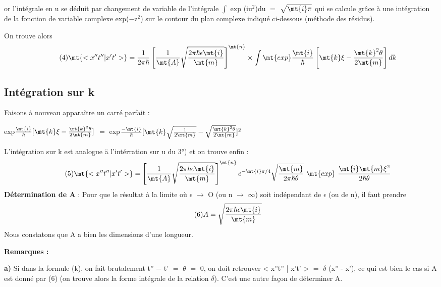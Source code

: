 or l'intégrale en u se déduit par changement de variable de
l'intégrale $\int$ exp (iu$^2$)du $=$ $\sqrt{\mt{i}\pi}$ qui se calcule grâce à une intégration
de la fonction de variable complexe exp($-$z$^2$) sur le contour du plan complexe
indiqué ci-dessous (méthode des résidus).
\begin{center}
\end{center}
On trouve alors
\[
\tag{4}\mt{<x''t''|x't'>} = \frac{1}{2\pi\hbar} \left[ \frac{1}{\mt{A}}
\sqrt{\frac{2\pi\hbar\epsilon\mt{i}}{\mt{m}}} \right]^\mt{n}
\times \int \mt{exp} \frac{\mt{i}}{\hbar}\left[\mt{k}\xi-\frac{\mt{k}^2\theta}{2\mt{m}}\right]dk 
\]

\subsection{Intégration sur k}%

Faisons à nouveau apparaître un carré parfait :
\begin{center}
exp$\frac{\mt{i}}{\hbar}[\mt{k}\xi-\frac{\mt{k}^2\theta}{2\mt{m}}]$ $=$
exp$\frac{-\mt{i}}{\hbar}[\mt{k}\sqrt{\frac{1}{2\mt{m}}}-\sqrt{\frac{\mt{k}^2\theta}{2\mt{m}}}]^2$
\end{center}
L'intégration sur k est analogue ä l'intérration sur u du 3°) et on
trouve enfin :
\[
\tag{5}\mt{<x''t''|x't'>} =\left[ \frac{1}{\mt{A}}
\sqrt{\frac{2\pi\hbar\epsilon\mt{i}}{\mt{m}}} \right]^\mt{n}
e^{-\mt{i}\pi/4}\sqrt{\frac{\mt{m}}{2\pi\hbar\theta}}
\ \mt{exp}\ \frac{\mt{i}\mt{m}\xi^2}{2\hbar\theta}
\]
{\bf Détermination de A} : Pour que le résultat à la limite où  $\epsilon$
$\to$ O (ou n $\to$ $\infty$)
soit indépendant de $\epsilon$ (ou de n), il faut prendre
\[
\tag{6} A = \sqrt{\frac{2\pi\hbar\epsilon\mt{i}}{\mt{m}}}
\]
Nous constatons que A a bien les dimensions d'une longueur.

 
{\bf Remarques :}

{\bf a)} Si dans la formule (k), on fait brutalement t'' $-$ t' $=$ $\theta$ $=$ 0, on doit
retrouver < x''t'' | x't' > $=$ $\delta$ (x'' - x'), ce qui est bien le cas si A est
donné par (6) (on trouve alors la forme intégrale de la relation $\delta$). C'est
une autre façon de déterminer A.

